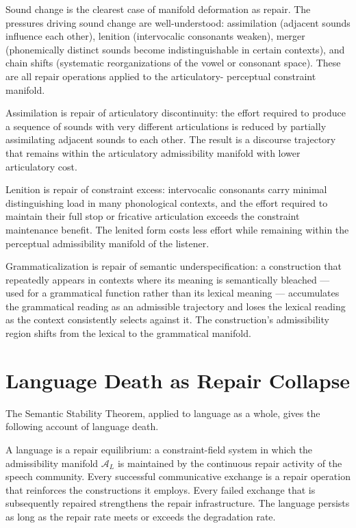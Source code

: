 \documentclass[11pt, a4paper]{article}
\theoremstyle{definition}
\theoremstyle{remark}
\begin{document}
Sound change is the clearest case of manifold deformation as repair. The
pressures driving sound change are well-understood: assimilation (adjacent
sounds influence each other), lenition (intervocalic consonants weaken),
merger (phonemically distinct sounds become indistinguishable in certain
contexts), and chain shifts (systematic reorganizations of the vowel or
consonant space). These are all repair operations applied to the articulatory-
perceptual constraint manifold.

Assimilation is repair of articulatory discontinuity: the effort required to
produce a sequence of sounds with very different articulations is reduced by
partially assimilating adjacent sounds to each other. The result is a discourse
trajectory that remains within the articulatory admissibility manifold with
lower articulatory cost.

Lenition is repair of constraint excess: intervocalic consonants carry minimal
distinguishing load in many phonological contexts, and the effort required to
maintain their full stop or fricative articulation exceeds the constraint
maintenance benefit. The lenited form costs less effort while remaining within
the perceptual admissibility manifold of the listener.

Grammaticalization is repair of semantic underspecification: a construction
that repeatedly appears in contexts where its meaning is semantically bleached
--- used for a grammatical function rather than its lexical meaning ---
accumulates the grammatical reading as an admissible trajectory and loses the
lexical reading as the context consistently selects against it. The
construction's admissibility region shifts from the lexical to the grammatical
manifold.

\section{Language Death as Repair Collapse}

The Semantic Stability Theorem, applied to language as a whole, gives the
following account of language death.

A language is a repair equilibrium: a constraint-field system in which the
admissibility manifold $\mathcal{A}_L$ is maintained by the continuous repair
activity of the speech community. Every successful communicative exchange
is a repair operation that reinforces the constructions it employs. Every
failed exchange that is subsequently repaired strengthens the repair
infrastructure. The language persists as long as the repair rate meets or
exceeds the degradation rate.
\end{document}
